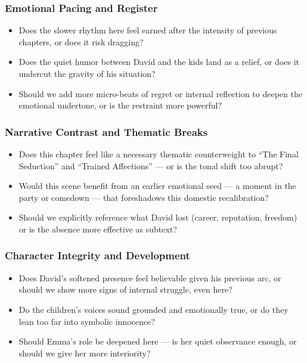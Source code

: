 \subsubsection*{Emotional Pacing and Register}

\begin{itemize}
  \item Does the slower rhythm here feel earned after the intensity of previous chapters, or does it risk dragging?
  \item Does the quiet humor between David and the kids land as a relief, or does it undercut the gravity of his situation?
  \item Should we add more micro-beats of regret or internal reflection to deepen the emotional undertone, or is the restraint more powerful?
\end{itemize}

\subsubsection*{Narrative Contrast and Thematic Breaks}

\begin{itemize}
  \item Does this chapter feel like a necessary thematic counterweight to ``The Final Seduction'' and ``Trained Affections'' — or is the tonal shift too abrupt?
  \item Would this scene benefit from an earlier emotional seed — a moment in the party or comedown — that foreshadows this domestic recalibration?
  \item Should we explicitly reference what David lost (career, reputation, freedom) or is the absence more effective as subtext?
\end{itemize}

\subsubsection*{Character Integrity and Development}

\begin{itemize}
  \item Does David’s softened presence feel believable given his previous arc, or should we show more signs of internal struggle, even here?
  \item Do the children’s voices sound grounded and emotionally true, or do they lean too far into symbolic innocence?
  \item Should Emma’s role be deepened here — is her quiet observance enough, or should we give her more interiority?
\end{itemize}


